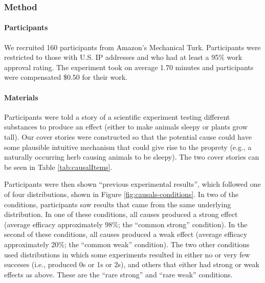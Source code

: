 \documentclass[english,floatsintext,man]{apa6}
\theoremstyle{definition}
\theoremstyle{definition}
\theoremstyle{definition}
\theoremstyle{remark}
\begin{document}
\subsubsection{Method}\label{method-5}

\paragraph{Participants}\label{participants-5}

We recruited 160 participants from Amazon's Mechanical Turk.
Participants were restricted to those with U.S. IP addresses and who had
at least a 95\% work approval rating. The experiment took on average
1.70 minutes and participants were compensated \$0.50 for their work.

\paragraph{Materials}\label{materials-3}

Participants were told a story of a scientific experiment testing
different substances to produce an effect (either to make animals sleepy
or plants grow tall). Our cover stories were constructed so that the
potential cause could have some plausible intuitive mechanism that could
give rise to the proprety (e.g., a naturally occurring herb causing
animals to be sleepy). The two cover stories can be seen in Table
\ref{tab:causalItems}.

Participants were then shown \enquote{previous experimental results},
which followed one of four distributions, shown in Figure
\ref{fig:causals-conditions}. In two of the conditions, participants saw
results that came from the same underlying distribution. In one of these
conditions, all causes produced a strong effect (average efficacy
approximately 98\%; the \enquote{common strong} condition). In the
second of these conditions, all causes produced a weak effect (average
efficacy approximately 20\%; the \enquote{common weak} condition). The
two other conditions used distributions in which some experiments
resulted in either no or very few succeses (i.e., produced 0s or 1s or
2s), and others that either had strong or weak effects as above. These
are the \enquote{rare strong} and \enquote{rare weak} conditions.
\end{document}
